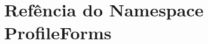 \hypertarget{namespaceProfileForms}{\section{Refência do Namespace Profile\-Forms}
\label{namespaceProfileForms}
}
